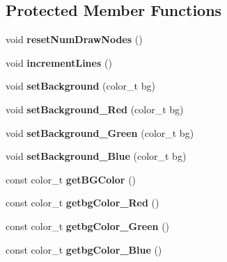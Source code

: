 \subsection*{Protected Member Functions}
\begin{DoxyCompactItemize}
\item 
\hypertarget{classCanvas_a6740306cd9f07901b2bc31c2d4bbc3a3}{}\label{classCanvas_a6740306cd9f07901b2bc31c2d4bbc3a3} 
void {\bfseries reset\+Num\+Draw\+Nodes} ()
\item 
\hypertarget{classCanvas_a9381d59bc23a115890fda270eecc69f1}{}\label{classCanvas_a9381d59bc23a115890fda270eecc69f1} 
void {\bfseries increment\+Lines} ()
\item 
\hypertarget{classCanvas_a0227884bab636ac95308b239c99f3466}{}\label{classCanvas_a0227884bab636ac95308b239c99f3466} 
void {\bfseries set\+Background} (color\+\_\+t bg)
\item 
\hypertarget{classCanvas_abf204df96ee5233c09817245942a52f5}{}\label{classCanvas_abf204df96ee5233c09817245942a52f5} 
void {\bfseries set\+Background\+\_\+\+Red} (color\+\_\+t bg)
\item 
\hypertarget{classCanvas_aacbfeb32c1611636b937d9eddc6042f0}{}\label{classCanvas_aacbfeb32c1611636b937d9eddc6042f0} 
void {\bfseries set\+Background\+\_\+\+Green} (color\+\_\+t bg)
\item 
\hypertarget{classCanvas_a447151f796bafcbd3cbbc5191d98aa40}{}\label{classCanvas_a447151f796bafcbd3cbbc5191d98aa40} 
void {\bfseries set\+Background\+\_\+\+Blue} (color\+\_\+t bg)
\item 
\hypertarget{classCanvas_a24ccd2a00993f23addb6b29080a9733a}{}\label{classCanvas_a24ccd2a00993f23addb6b29080a9733a} 
const color\+\_\+t {\bfseries get\+B\+G\+Color} ()
\item 
\hypertarget{classCanvas_a71cfe236e024ae60ac8941cca8f1eb7a}{}\label{classCanvas_a71cfe236e024ae60ac8941cca8f1eb7a} 
const color\+\_\+t {\bfseries getbg\+Color\+\_\+\+Red} ()
\item 
\hypertarget{classCanvas_a8d10f424606d7ac03bdb1197bd23742c}{}\label{classCanvas_a8d10f424606d7ac03bdb1197bd23742c} 
const color\+\_\+t {\bfseries getbg\+Color\+\_\+\+Green} ()
\item 
\hypertarget{classCanvas_a62e8cb7b9c0a99b64adda7ff5330e5a2}{}\label{classCanvas_a62e8cb7b9c0a99b64adda7ff5330e5a2} 
const color\+\_\+t {\bfseries getbg\+Color\+\_\+\+Blue} ()
\item 
\hypertarget{classCanvas_a2b7899e3b8ff4d9938b1b385011ccb25}{}\label{classCanvas_a2b7899e3b8ff4d9938b1b385011ccb25} 

\end{DoxyCompactItemize}
